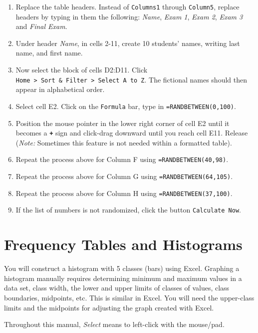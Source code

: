 \documentclass[
  12pt,
  letterpaper,
]{book}
\providecommand{\tightlist}{%
  \setlength{\itemsep}{0pt}\setlength{\parskip}{0pt}}
\begin{document}
\begin{enumerate}
\def\labelenumi{\arabic{enumi}.}
\setcounter{enumi}{3}
\tightlist
\item
  Replace the table headers. Instead of \texttt{Columns1} through \texttt{Column5}, replace headers by typing in them the following: \emph{Name}, \emph{Exam 1}, \emph{Exam 2}, \emph{Exam 3} and \emph{Final Exam}.
\item
  Under header \emph{Name}, in cells 2-11, create 10 students' names, writing last name, and first name.
\item
  Now select the block of cells D2:D11. Click \texttt{Home\ \textgreater{}\ Sort\ \&\ Filter\ \textgreater{}\ Select\ A\ to\ Z}. The fictional names should then appear in alphabetical order.
\item
  Select cell E2. Click on the \texttt{Formula} bar, type in \texttt{=RANDBETWEEN(0,100)}.
\item
  Position the mouse pointer in the lower right corner of cell E2 until it becomes a \textbf{\texttt{+}} sign and click-drag downward until you reach cell E11. Release (\emph{Note:} Sometimes this feature is not needed within a formatted table).
\item
  Repeat the process above for Column F using \texttt{=RANDBETWEEN(40,98)}.
\item
  Repeat the process above for Column G using \texttt{=RANDBETWEEN(64,105)}.
\item
  Repeat the process above for Column H using \texttt{=RANDBETWEEN(37,100)}.
\item
  If the list of numbers is not randomized, click the button \texttt{Calculate\ Now}.
\end{enumerate}

\hypertarget{frequency-tables-and-histograms}{%
\chapter{Frequency Tables and Histograms}\label{frequency-tables-and-histograms}}

You will construct a histogram with 5 classes (bars) using Excel.
Graphing a histogram manually requires determining minimum and maximum values in a data set, class width, the lower and upper limits of classes of values, class boundaries, midpoints, etc. This is similar in Excel. You will need the upper-class limits and the midpoints for adjusting the graph created with Excel.

Throughout this manual, \emph{Select} means to left-click with the mouse/pad.
\end{document}
